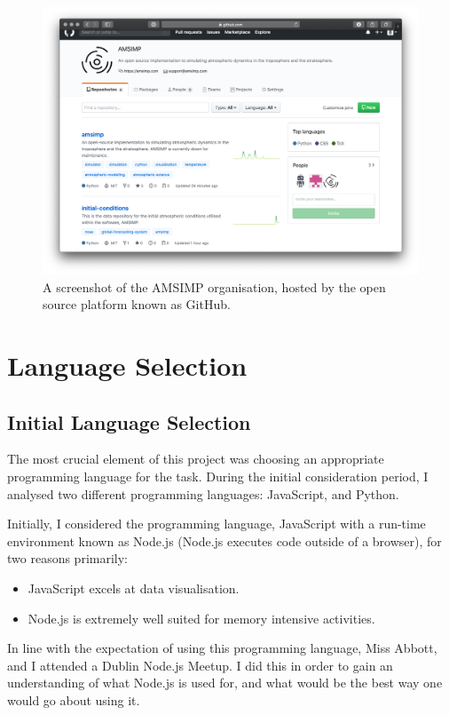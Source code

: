 \begin{figure}[H]
    \centering
    \includegraphics[width=.8\linewidth]{Images/github}
    \caption{A screenshot of the AMSIMP organisation, hosted by the open source platform known as GitHub.}
    \label{github}
\end{figure}

\section{Language Selection}
\subsection{Initial Language Selection}
The most crucial element of this project was choosing an appropriate programming language for the task. During the initial consideration period, I analysed two different programming languages: JavaScript, and Python\cite{python}. 

Initially, I considered the programming language, JavaScript with a run-time environment known as Node.js (Node.js executes code outside of a browser), for two reasons primarily:

\begin{itemize}
    \item JavaScript excels at data visualisation.
    \item Node.js is extremely well suited for memory intensive activities.
\end{itemize}

In line with the expectation of using this programming language, Miss Abbott, and I attended a Dublin Node.js Meetup. I did this in order to gain an understanding of what Node.js is used for, and what would be the best way one would go about using it. 

